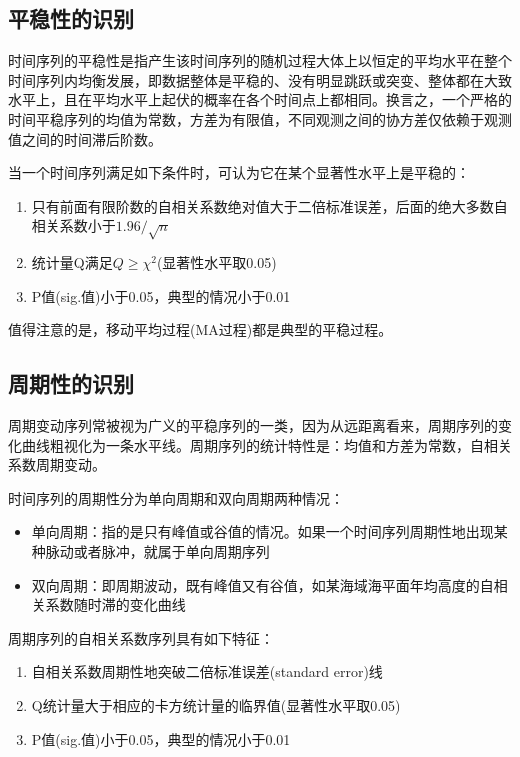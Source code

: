 \subsection{平稳性的识别}
时间序列的平稳性是指产生该时间序列的随机过程大体上以恒定的平均水平在整个时间序列内均衡发展，即数据整体是平稳的、没有明显跳跃或突变、整体都在大致水平上，且在平均水平上起伏的概率在各个时间点上都相同。换言之，一个严格的时间平稳序列的均值为常数，方差为有限值，不同观测之间的协方差仅依赖于观测值之间的时间滞后阶数。

当一个时间序列满足如下条件时，可认为它在某个显著性水平上是平稳的：
\begin{enumerate}
    \item 只有前面有限阶数的自相关系数绝对值大于二倍标准误差，后面的绝大多数自相关系数小于$1.96/\sqrt{n}$
    \item 统计量Q满足$Q \geq \chi^2$(显著性水平取0.05)
    \item P值(sig.值)小于0.05，典型的情况小于0.01
\end{enumerate}

值得注意的是，移动平均过程(MA过程)都是典型的平稳过程。

\subsection{周期性的识别}
周期变动序列常被视为广义的平稳序列的一类，因为从远距离看来，周期序列的变化曲线粗视化为一条水平线。周期序列的统计特性是：均值和方差为常数，自相关系数周期变动。

时间序列的周期性分为单向周期和双向周期两种情况：
\begin{itemize}
    \item 单向周期：指的是只有峰值或谷值的情况。如果一个时间序列周期性地出现某种脉动或者脉冲，就属于单向周期序列
    \item 双向周期：即周期波动，既有峰值又有谷值，如某海域海平面年均高度的自相关系数随时滞的变化曲线
\end{itemize}

周期序列的自相关系数序列具有如下特征：
\begin{enumerate}
    \item 自相关系数周期性地突破二倍标准误差(standard error)线
    \item Q统计量大于相应的卡方统计量的临界值(显著性水平取0.05)
    \item P值(sig.值)小于0.05，典型的情况小于0.01
\end{enumerate}

